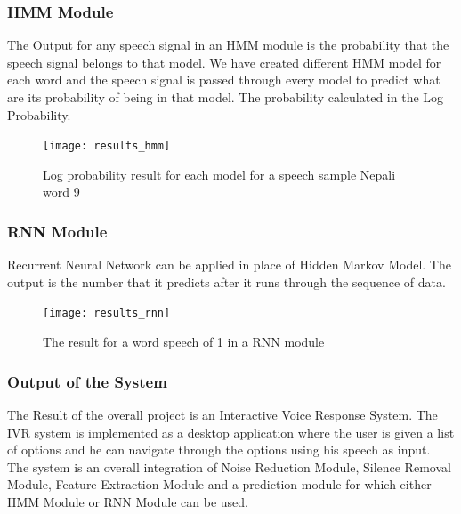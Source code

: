 	
	

\subsubsection{HMM Module}


The Output for any speech signal in an HMM module is the probability that the speech signal belongs to that model. We have created different HMM model for each word and the speech signal is passed through every model to predict what are its probability of being in that model. The probability calculated in the Log Probability.

\begin{figure}[H]
	\begin{center}
		
		\texttt{[image: results\_hmm]}
		\caption{Log probability result for each model for a speech sample Nepali word 9}
	\end{center}
\end{figure}




\subsubsection{RNN Module}


Recurrent Neural Network can be applied in place of Hidden Markov Model. The output is the number that it predicts after it runs through the sequence of data.

\begin{figure}[H]
	\begin{center}
		
		\texttt{[image: results\_rnn]}
		\caption{The result for a word speech of 1 in a RNN module}
	\end{center}
\end{figure}



\subsubsection{Output of the System}

The Result of the overall project is an Interactive Voice Response System. The IVR system is implemented as a desktop application where the user is given a list of options and he can navigate through the options using his speech as input. The system is an overall integration
of Noise Reduction Module, Silence Removal Module, Feature Extraction Module and a prediction module for which either HMM Module or RNN Module can be used.

